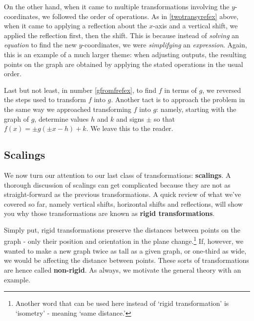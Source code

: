 \documentclass{ximera}
\begin{document}
\smallskip


On the other hand, when it came to multiple transformations involving the $y$-coordinates, we followed the order of operations. As in \ref{twotransyrefex} above, when it came to applying a reflection about the $x$-axis and a vertical shift, we applied the reflection first, then the shift.  This is because instead of \textit{solving} an \textit{equation} to find the new $y$-coordinates, we were \textit{simplifying }an \textit{expression}.  Again, this is an example of a much larger theme:  when adjusting outputs, the resulting points on the graph are obtained by applying the stated operations in the usual order.


\smallskip


Last but not least, in number \ref{gfromfrefex}, to find $f$ in terms of $g$, we reversed the steps used to transform $f$ into $g$.  Another tact is to approach the problem in the same way we approached transforming $f$ into $g$: namely, starting with the graph of $g$, determine values $h$ and $k$ and signs $\pm$ so that $f(x) = \pm g(\pm x - h) + k$.  We leave this to the reader.


\subsection{Scalings}
\label{Scaling}

We now turn our attention to our last class of transformations: \textbf{scalings}.  A thorough discussion of scalings can get complicated because they are not as straight-forward as the previous transformations.  A quick review of what we've covered so far, namely vertical shifts, horizontal shifts and reflections, will show you why those transformations are known as \textbf{rigid transformations}.  

\smallskip

Simply put, rigid transformations preserve the distances between points on the graph -  only their position and orientation in the plane change.\footnote{Another word that can be used here instead of `rigid transformation' is `isometry' - meaning `same distance.'}  If, however, we wanted to make a new graph twice as tall as a given graph, or one-third as wide, we would be affecting the distance between points. These sorts of transformations are hence called \textbf{non-rigid}.  As always, we motivate the general theory with an example.

\smallskip
\end{document}
